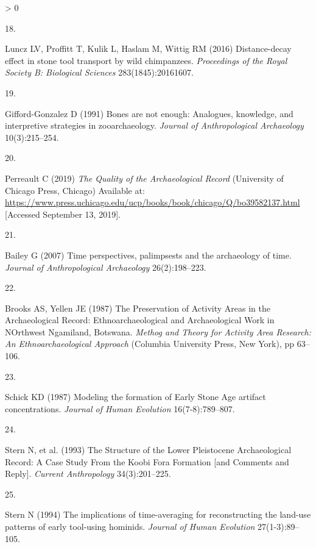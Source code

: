 \documentclass[9pt,twocolumn,twoside,]{pnas-new}
\newlength{\csllabelwidth}
\newlength{\cslhangindent}
\newenvironment{CSLReferences}[3] %
 {%
  \setlength{\parindent}{0pt}
  \ifodd #1 \everypar{\setlength{\hangindent}{\cslhangindent}}\ignorespaces\fi
  \ifnum #2 > 0
  \setlength{\parskip}{#2\baselineskip}
  \fi
 }%
 {}
\newcommand{\CSLLeftMargin}[1]{\parbox[t]{\csllabelwidth}{#1}}
\newcommand{\CSLRightInline}[1]{\parbox[t]{\linewidth - \csllabelwidth}{#1}}
\begin{document}
\begin{CSLReferences}{0}{0}
\leavevmode\hypertarget{ref-lunczDistancedecayEffectStone2016}{}%
\CSLLeftMargin{18. }
\CSLRightInline{Luncz LV, Proffitt T, Kulik L, Haslam M, Wittig RM
(2016) Distance-decay effect in stone tool transport by wild
chimpanzees. \emph{Proceedings of the Royal Society B: Biological
Sciences} 283(1845):20161607.}

\leavevmode\hypertarget{ref-gifford-gonzalezBonesAreNot1991}{}%
\CSLLeftMargin{19. }
\CSLRightInline{Gifford-Gonzalez D (1991) Bones are not enough:
{Analogues}, knowledge, and interpretive strategies in zooarchaeology.
\emph{Journal of Anthropological Archaeology} 10(3):215--254.}

\leavevmode\hypertarget{ref-perreaultQualityArchaeologicalRecord2019}{}%
\CSLLeftMargin{20. }
\CSLRightInline{Perreault C (2019) \emph{The {Quality} of the
{Archaeological Record}} ({University of Chicago Press}, {Chicago})
Available at:
\url{https://www.press.uchicago.edu/ucp/books/book/chicago/Q/bo39582137.html}
{[}Accessed September 13, 2019{]}.}

\leavevmode\hypertarget{ref-baileyTimePerspectivesPalimpsests2007}{}%
\CSLLeftMargin{21. }
\CSLRightInline{Bailey G (2007) Time perspectives, palimpsests and the
archaeology of time. \emph{Journal of Anthropological Archaeology}
26(2):198--223.}

\leavevmode\hypertarget{ref-brooksPreservationActivityAreas1987}{}%
\CSLLeftMargin{22. }
\CSLRightInline{Brooks AS, Yellen JE (1987) The {Preservation} of
{Activity Areas} in the {Archaeological Record}: {Ethnoarchaeological}
and {Archaeological Work} in {NOrthwest Ngamiland}, {Botswana}.
\emph{Methog and {Theory} for {Activity Area Research}: {An
Ethnoarchaeological Approach}} ({Columbia University Press}, {New
York}), pp 63--106.}

\leavevmode\hypertarget{ref-schickModelingFormationEarly1987}{}%
\CSLLeftMargin{23. }
\CSLRightInline{Schick KD (1987) Modeling the formation of {Early Stone
Age} artifact concentrations. \emph{Journal of Human Evolution}
16(7-8):789--807.}

\leavevmode\hypertarget{ref-Stern1993}{}%
\CSLLeftMargin{24. }
\CSLRightInline{Stern N, et al. (1993) The {Structure} of the {Lower
Pleistocene Archaeological Record}: {A Case Study From} the {Koobi Fora
Formation} {[}and {Comments} and {Reply}{]}. \emph{Current Anthropology}
34(3):201--225.}

\leavevmode\hypertarget{ref-sternImplicationsTimeaveragingReconstructing1994}{}%
\CSLLeftMargin{25. }
\CSLRightInline{Stern N (1994) The implications of time-averaging for
reconstructing the land-use patterns of early tool-using hominids.
\emph{Journal of Human Evolution} 27(1-3):89--105.}


\end{CSLReferences}
\end{document}
